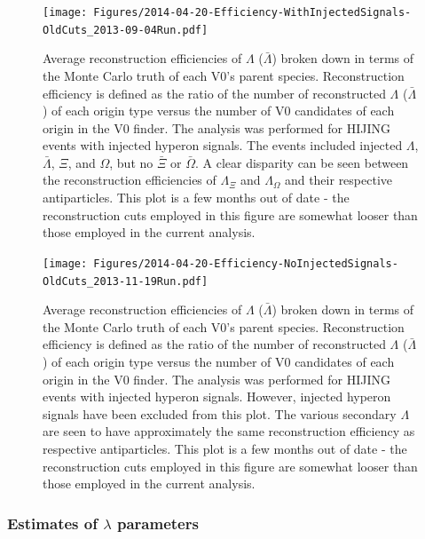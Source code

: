 \begin{figure}[hbtp]
\texttt{[image: Figures/2014-04-20-Efficiency-WithInjectedSignals-OldCuts\_2013-09-04Run.pdf]}
\caption[$Lambda$ reconstruction efficiencies with injected signals]{Average reconstruction efficiencies of $\Lambda$ ($\bar{\Lambda}$) broken down in terms of the Monte Carlo truth of each V0's parent species.  
Reconstruction efficiency is defined as the ratio of the number of reconstructed $\Lambda$ ($\bar{\Lambda}$) of each origin type versus the number of V0 candidates of each origin in the V0 finder.  
The analysis was performed for HIJING events with injected hyperon signals.  
The events included injected $\Lambda$, $\bar{\Lambda}$, $\Xi$, and $\Omega$, but no $\bar{\Xi}$ or $\bar{\Omega}$.  
A clear disparity can be seen between the reconstruction efficiencies of $\Lambda_{\Xi}$ and $\Lambda_{\Omega}$ and their respective antiparticles.  
This plot is a few months out of date - the reconstruction cuts employed in this figure are somewhat looser than those employed in the current analysis.}
\label{fig:MCEfficiencyWithInjected}
\end{figure}

\begin{figure}[hbtp]
\texttt{[image: Figures/2014-04-20-Efficiency-NoInjectedSignals-OldCuts\_2013-11-19Run.pdf]}
\caption[$Lambda$ reconstruction efficiencies without injected signals]{Average reconstruction efficiencies of $\Lambda$ ($\bar{\Lambda}$) broken down in terms of the Monte Carlo truth of each V0's parent species.  
Reconstruction efficiency is defined as the ratio of the number of reconstructed $\Lambda$ ($\bar{\Lambda}$) of each origin type versus the number of V0 candidates of each origin in the V0 finder.  
The analysis was performed for HIJING events with injected hyperon signals.  
However, injected hyperon signals have been excluded from this plot.  
The various secondary $\Lambda$ are seen to have approximately the same reconstruction efficiency as respective antiparticles.  
This plot is a few months out of date - the reconstruction cuts employed in this figure are somewhat looser than those employed in the current analysis.}
\label{fig:MCEfficiencyNoInjected}
\end{figure}




\subsubsection{Estimates of \texorpdfstring{$\lambda$}{lambda} parameters}
\label{sec:LambdaParamEstimates}

